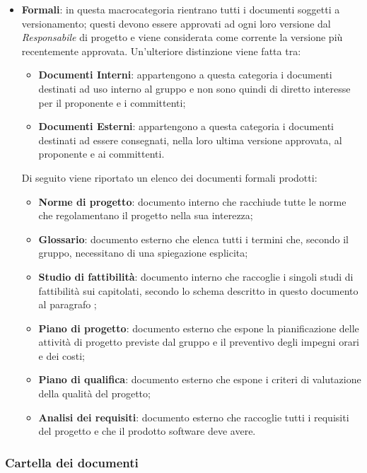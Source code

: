 \begin{itemize}
    \item \textbf{Formali}: in questa macrocategoria rientrano tutti i documenti soggetti a versionamento; questi devono
    essere approvati ad ogni loro versione dal \emph{Responsabile} di progetto e viene considerata come corrente la
    versione più recentemente approvata. Un'ulteriore distinzione viene fatta tra:
    \begin{itemize}
        \item \textbf{Documenti Interni}: appartengono a questa categoria i documenti destinati ad uso interno al
        gruppo e non sono quindi di diretto interesse per il proponente e i committenti;
        \item \textbf{Documenti Esterni}: appartengono a questa categoria i documenti destinati ad essere consegnati,
        nella loro ultima versione approvata, al proponente e ai committenti.
    \end{itemize}
    Di seguito viene riportato un elenco dei documenti formali prodotti:
    \begin{itemize}
        \item \textbf{Norme di progetto}: documento interno che racchiude tutte le norme che regolamentano il progetto
        nella sua interezza;
        \item \textbf{Glossario}: documento esterno che elenca tutti i termini che, secondo il gruppo, necessitano di
        una spiegazione esplicita;
        \item \textbf{Studio di fattibilità}: documento interno che raccoglie i singoli studi di fattibilità sui
        capitolati, secondo lo schema descritto in questo documento al paragrafo ;
        \item \textbf{Piano di progetto}: documento esterno che espone la pianificazione delle attività di progetto
        previste dal gruppo e il preventivo degli impegni orari e dei costi;
        \item \textbf{Piano di qualifica}: documento esterno che espone i criteri di valutazione della qualità del
        progetto;
        \item \textbf{Analisi dei requisiti}: documento esterno che raccoglie tutti i requisiti del progetto e che il
        prodotto software deve avere.
  \end{itemize}

\end{itemize}

\subsubsection{Cartella dei documenti}
\label{ssub:cartella_doc}

